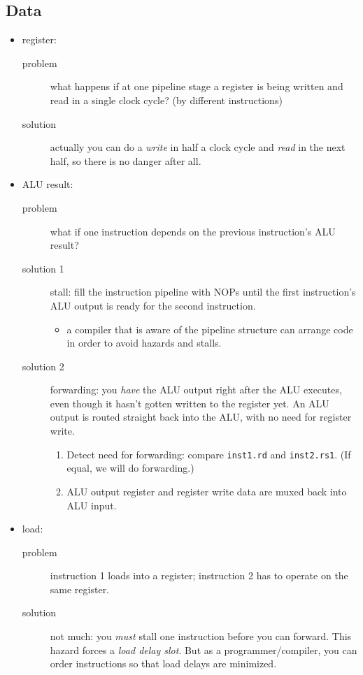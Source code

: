 \subsection{Data}
\begin{itemize}
\item register:
\begin{description}
	\item[problem] what happens if at one pipeline stage a register is being written and read in a single clock cycle? (by different instructions)
	\item[solution] actually you can do a \emph{write} in half a clock cycle and \emph{read} in the next half, so there is no danger after all.
\end{description}

\item ALU result:
\begin{description}
	\item[problem] what if one instruction depends on the previous instruction's ALU result?
	\item[solution 1] stall: fill the instruction pipeline with NOPs until the first instruction's ALU output is ready for the second instruction.
	\begin{itemize}
		\item a compiler that is aware of the pipeline structure can arrange code in order to avoid hazards and stalls.
	\end{itemize}
	\item[solution 2] forwarding: you \emph{have} the ALU output right after the ALU executes, even though it hasn't gotten written to the register yet.
	An ALU output is routed straight back into the ALU, with no need for register write.
	\begin{enumerate}
		\item Detect need for forwarding: compare \texttt{inst1.rd} and \texttt{inst2.rs1}. (If equal, we will do forwarding.)
		\item ALU output register and register write data are muxed back into ALU input.
	\end{enumerate}
\end{description}

\item load:
\begin{description}
	\item[problem] instruction 1 loads into a register; instruction 2 has to operate on the same register.
	\item[solution] not much: you \emph{must} stall one instruction before you can forward.
		This hazard forces a \emph{load delay slot}. But as a programmer/compiler, you can order instructions so that load delays are minimized.
\end{description}
\end{itemize}

